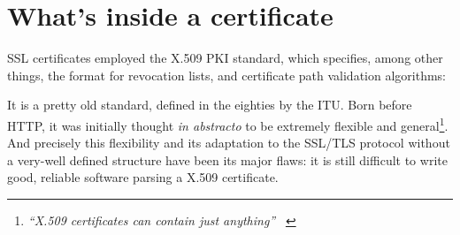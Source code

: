 \section{What's inside a certificate \label{sec:ssl:x509}}
SSL certificates employed the X.509 PKI standard, which specifies, among other
things, the format for revocation lists, and certificate path validation
algorithms:
\\
\begin{center}
\end{center}

It is a pretty old standard, defined in the eighties by the ITU.
Born before HTTP, it was initially thought \emph{in abstracto} to be
extremely flexible and general\footnote{
  \textit{``X.509 certificates can contain just anything''} ~\cite{SSLiverse}
}.
And precisely this flexibility and its adaptation to the SSL/TLS protocol
without a very-well defined structure have been its major flaws: it is still
difficult to write good, reliable software parsing a X.509 certificate.

